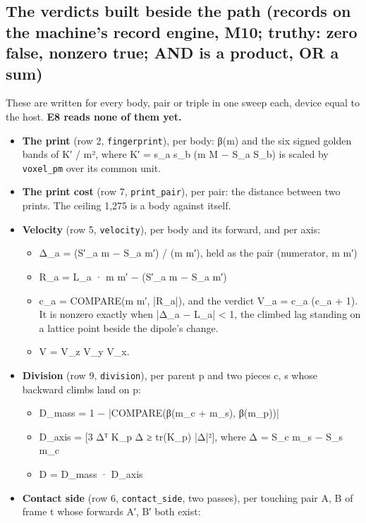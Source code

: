 \subsection{\texorpdfstring{The verdicts built beside the path (records on the machine's record engine, M10; truthy: zero false, nonzero true; AND is a product, OR a sum)}{The verdicts built beside the path (records on the machine's record engine, M10; truthy: zero false, nonzero true; AND is a product, OR a sum)}}

These are written for every body, pair or triple in one sweep each, device equal to the host. \textbf{E8 reads none of them yet.}

\begin{itemize}
\item \textbf{The print} (row 2, \texttt{fingerprint}), per body: β(m) and the six signed golden bands of K′ / m², where K′ = s\_\allowbreak{}a s\_\allowbreak{}b (m M − S\_\allowbreak{}a S\_\allowbreak{}b) is scaled by \texttt{voxel\_\allowbreak{}pm} over its common unit.
\item \textbf{The print cost} (row 7, \texttt{print\_\allowbreak{}pair}), per pair: the distance between two prints. The ceiling 1,275 is a body against itself.
\item \textbf{Velocity} (row 5, \texttt{velocity}), per body and its forward, and per axis:

\begin{itemize}
\item Δ\_\allowbreak{}a = (S′\_\allowbreak{}a m − S\_\allowbreak{}a m′) / (m m′), held as the pair (numerator, m m′)
\item R\_\allowbreak{}a = L\_\allowbreak{}a · m m′ − (S′\_\allowbreak{}a m − S\_\allowbreak{}a m′)
\item c\_\allowbreak{}a = COMPARE(m m′, |R\_\allowbreak{}a|), and the verdict V\_\allowbreak{}a = c\_\allowbreak{}a (c\_\allowbreak{}a + 1). It is nonzero exactly when |Δ\_\allowbreak{}a − L\_\allowbreak{}a| < 1, the climbed lag standing on a lattice point beside the dipole's change.
\item V = V\_\allowbreak{}z V\_\allowbreak{}y V\_\allowbreak{}x.
\end{itemize}
\item \textbf{Division} (row 9, \texttt{division}), per parent p and two pieces c, s whose backward climbs land on p:

\begin{itemize}
\item D\_\allowbreak{}mass = 1 − |COMPARE(β(m\_\allowbreak{}c + m\_\allowbreak{}s), β(m\_\allowbreak{}p))|
\item D\_\allowbreak{}axis = [3 Δᵀ K\_\allowbreak{}p Δ ≥ tr(K\_\allowbreak{}p) |Δ|²], where Δ = S\_\allowbreak{}c m\_\allowbreak{}s − S\_\allowbreak{}s m\_\allowbreak{}c
\item D = D\_\allowbreak{}mass · D\_\allowbreak{}axis
\end{itemize}
\item \textbf{Contact side} (row 6, \texttt{contact\_\allowbreak{}side}, two passes), per touching pair A, B of frame t whose forwards A′, B′ both exist:


\end{itemize}
